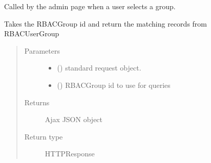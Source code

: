 \documentclass[letterpaper,10pt,english]{sphinxmanual}
\begin{document}

\begin{fulllineitems}
\label{\detokenize{rbac:rbac.ajax.group_to_user_ajax}}
Called by the admin page when a user selects a group.

Takes the RBACGroup id and return the matching records from RBACUserGroup
\begin{quote}\begin{description}
\item[{Parameters}] \leavevmode\begin{itemize}
\item {} 
 () \textendash{} standard request object.

\item {} 
 () \textendash{} RBACGroup id to use for queries

\end{itemize}

\item[{Returns}] \leavevmode
Ajax JSON object

\item[{Return type}] \leavevmode
HTTPResponse

\end{description}\end{quote}

\end{fulllineitems}

\end{document}
